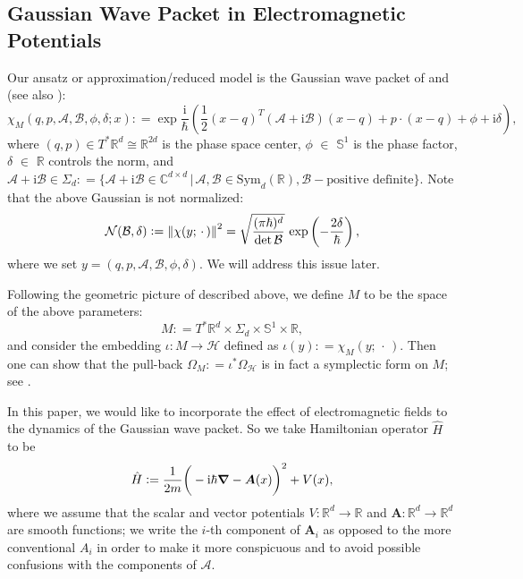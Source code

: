 \documentclass[10pt]{article}
\def\defeq{\mathrel{\mathop:}=}
\newcommand{\vect}[1]{\boldsymbol{#1}}
\begin{document}
\subsection{Gaussian Wave Packet in Electromagnetic Potentials}
Our ansatz or approximation/reduced model is the Gaussian wave packet of
\citet{He1975a, He1976b, He1981} and \citet{Ha1980, Ha1998} (see also \citet{Li1986}):
\begin{equation}
  \label{eq:GWP}
  \chi_M({q}, {p}, \mathcal{A}, \mathcal{B}, \phi, \delta; x) 
  \defeq 
  \exp{
	\frac{\text{i}}{\hbar}
	\left(
	  \frac{1}{2} {(x-q)}^T (\mathcal{A} + \text{i} \mathcal{B})(x-q) 
		  + p\cdot (x-q) + \phi + \text{i} \delta 
    \right)
  },
\end{equation}
where $(q, p) \in T^{*}\mathbb{R}^d \cong \mathbb{R}^{2d}$ is the phase space
center, $\phi$ $\in$ $\mathbb{S}^1$ is the phase factor, $\delta$ $\in$
$\mathbb{R}$ controls the norm, and 
$\mathcal{A} + \text{i} \mathcal{B} \in \Sigma_d 
	\defeq \{ 
		\mathcal{A} + \text{i} \mathcal{B} \in \mathbb{C}^{d\times d} 
		\,|\,
		\mathcal{A},\mathcal{B} \in \text{Sym}_d(\mathbb{R}), \mathcal{B}-\text{positive definite}
	\}$.
Note that the above Gaussian is not normalized:
\begin{equation}
  \label{eq:N}
  \mathcal{N}(\mathcal{B},\delta) \defeq \norm{\chi(y;\,\cdot\,)}^{2}
  = \sqrt{ \frac{(\pi\hbar)^{d}}{\det \mathcal{B}} }\, \exp\left( -\frac{2\delta}{\hbar} \right),
\end{equation}
where we set $y = ({q}, {p}, \mathcal{A}, \mathcal{B}, \phi, \delta)$.
We will address this issue later.

Following the geometric picture of \citet{Lu2008} described above, we define $M$
to be the space of the above parameters:
\begin{equation*}
  M \defeq T^*\mathbb{R}^d \times \Sigma_d \times \mathbb{S}^1 \times \mathbb{R},
\end{equation*}
and consider the embedding $\iota\colon M \to \mathcal{H}$ defined as 
$\iota(y) \defeq \chi_{M}(y;\,\cdot\,)$.
Then one can show that the pull-back $\Omega_{M} \defeq \iota^{*}\Omega_{\mathcal{H}}$
is in fact a symplectic form on $M$; see \citet[Section~3]{OhLe2013}.

In this paper, we would like to incorporate the effect of electromagnetic fields
to the dynamics of the Gaussian wave packet. So we take Hamiltonian operator
$\hat{H}$ to be 
\begin{equation}\label{eq:hatH}
  \hat{H} \defeq \frac{1}{2m}\bigg( -\text{i}\hbar \grad - \vect{A}(x) \bigg)^2 + V(x),
\end{equation}
where we assume that the scalar and vector potentials $V\colon \mathbb{R}^d
\rightarrow \mathbb{R}$ and $\vect{A}\colon \mathbb{R}^d \rightarrow
\mathbb{R}^d$ are smooth functions; we write the $i$-th component of
$\vect{A}_{i}$ as opposed to the more conventional $A_{i}$ in order to make it
more conspicuous and to avoid possible confusions with the components of
$\mathcal{A}$.
\end{document}
